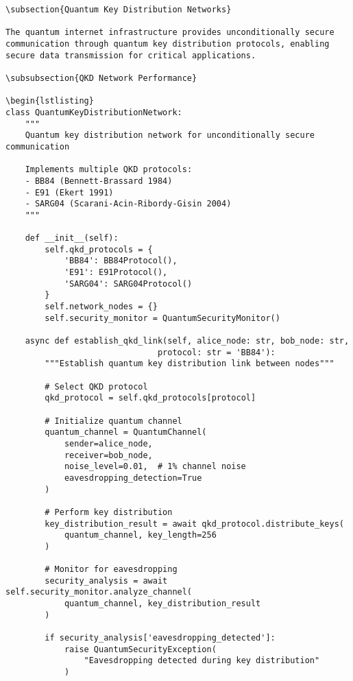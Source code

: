 \documentclass[12pt,a4paper]{report}
\begin{document}
\begin{lstlisting}
\subsection{Quantum Key Distribution Networks}

The quantum internet infrastructure provides unconditionally secure communication through quantum key distribution protocols, enabling secure data transmission for critical applications.

\subsubsection{QKD Network Performance}

\begin{lstlisting}
class QuantumKeyDistributionNetwork:
    """
    Quantum key distribution network for unconditionally secure communication

    Implements multiple QKD protocols:
    - BB84 (Bennett-Brassard 1984)
    - E91 (Ekert 1991)
    - SARG04 (Scarani-Acin-Ribordy-Gisin 2004)
    """

    def __init__(self):
        self.qkd_protocols = {
            'BB84': BB84Protocol(),
            'E91': E91Protocol(),
            'SARG04': SARG04Protocol()
        }
        self.network_nodes = {}
        self.security_monitor = QuantumSecurityMonitor()

    async def establish_qkd_link(self, alice_node: str, bob_node: str,
                               protocol: str = 'BB84'):
        """Establish quantum key distribution link between nodes"""

        # Select QKD protocol
        qkd_protocol = self.qkd_protocols[protocol]

        # Initialize quantum channel
        quantum_channel = QuantumChannel(
            sender=alice_node,
            receiver=bob_node,
            noise_level=0.01,  # 1% channel noise
            eavesdropping_detection=True
        )

        # Perform key distribution
        key_distribution_result = await qkd_protocol.distribute_keys(
            quantum_channel, key_length=256
        )

        # Monitor for eavesdropping
        security_analysis = await self.security_monitor.analyze_channel(
            quantum_channel, key_distribution_result
        )

        if security_analysis['eavesdropping_detected']:
            raise QuantumSecurityException(
                "Eavesdropping detected during key distribution"
            )


\end{lstlisting}
\end{document}
